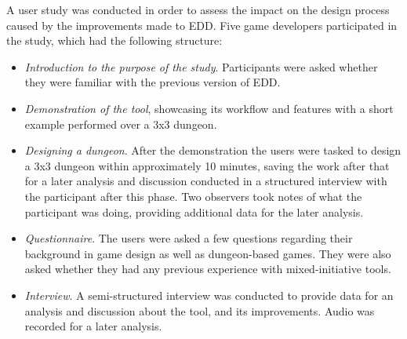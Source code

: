 A user study was conducted in order to assess the impact on the design process caused by the improvements made to EDD. Five game developers participated in the study, which had the following structure:
\begin{itemize}
\item \textit{Introduction to the purpose of the study}. Participants were asked whether they were familiar with the previous version of EDD.
\item \textit{Demonstration of the tool}, showcasing its workflow and features with a short example performed over a 3x3 dungeon. 
\item \textit{Designing a dungeon}. After the demonstration the users were tasked to design a 3x3 dungeon within approximately 10 minutes, saving the work after that for a later analysis and discussion conducted in a structured interview with the participant after this phase. Two observers took notes of what the participant was doing, providing additional data for the later analysis.
\item \textit{Questionnaire}. The users were asked a few questions regarding their background in game design as well as dungeon-based games. They were also asked whether they had any previous experience with mixed-initiative tools.
\item \textit{Interview}. A semi-structured interview was conducted to provide data for an analysis and discussion about the tool, and its improvements. Audio was recorded for a later analysis.
\end{itemize}

